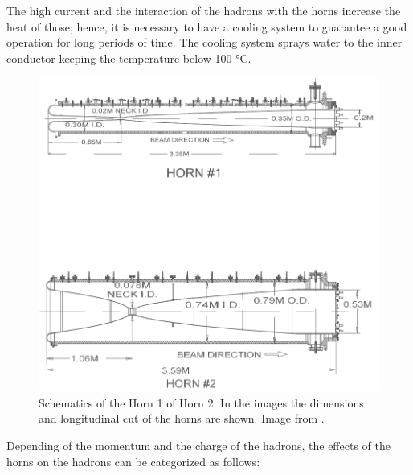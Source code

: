 The high current and the interaction of the hadrons with the horns increase the heat of those; hence, it is necessary to have a cooling system to guarantee a good operation for long periods of time. The cooling system sprays water to the inner conductor keeping the temperature below 100 °C. 

\begin{figure}[!htb]
\centering
\includegraphics[scale=0.33]{Figures/Chapter2/SchematicMagneticHorns.png}
        \caption{Schematics of the Horn 1 of Horn 2. In the images the dimensions and longitudinal cut of the horns are shown. Image from \cite{Numi}.} 
\label{fig:MnvExp:NuMI:NuMIHornsSchematic}
\end{figure}

Depending of the momentum and the charge of the hadrons, the effects of the horns on the hadrons can be categorized as follows:

